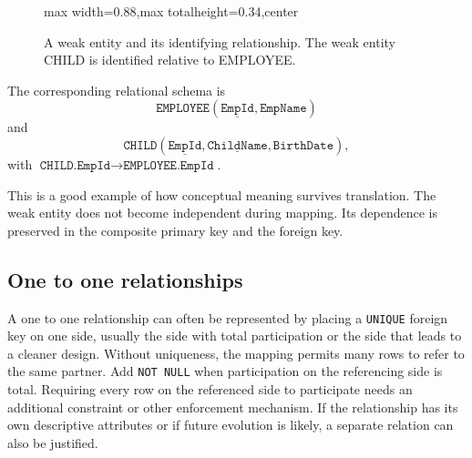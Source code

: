 \documentclass[11pt,a4paper,openany]{book}
\newcommand{\keyattr}[1]{\underline{#1}}
\begin{document}
\begin{figure}[tbp]
\centering
\begin{adjustbox}{max width=0.88\linewidth,max totalheight=0.34\textheight,center}
\end{adjustbox}
\caption{A weak entity and its identifying relationship. The weak entity CHILD is identified relative to EMPLOYEE.}
\label{fig:rel-weak-entity-rule-er}
\end{figure}

The corresponding relational schema is
\[
\texttt{EMPLOYEE}(\underline{\texttt{EmpId}}, \texttt{EmpName})
\]
and
\[
\texttt{CHILD}(\underline{\texttt{EmpId}}, \underline{\texttt{ChildName}}, \texttt{BirthDate}),
\]
with \(\texttt{CHILD.EmpId} \rightarrow \texttt{EMPLOYEE.EmpId}\).

This is a good example of how conceptual meaning survives translation. The weak entity does not become independent during mapping. Its dependence is preserved in the composite primary key and the foreign key.

\subsection{One to one relationships}
A one to one relationship can often be represented by placing a \texttt{UNIQUE} foreign key on one side, usually the side with total participation or the side that leads to a cleaner design. Without uniqueness, the mapping permits many rows to refer to the same partner. Add \texttt{NOT NULL} when participation on the referencing side is total. Requiring every row on the referenced side to participate needs an additional constraint or other enforcement mechanism. If the relationship has its own descriptive attributes or if future evolution is likely, a separate relation can also be justified.
\end{document}
